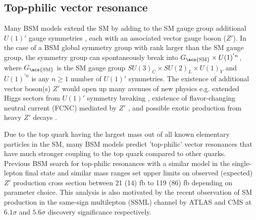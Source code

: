 \documentclass[../thesis.tex]{subfiles}
\begin{document}
\subsection{Top-philic vector resonance}
\label{sec:ttZp}
Many \acs{BSM} models extend the \acs{SM} by adding to the \acs{SM} gauge group additional $U(1)'$ gauge symmetries \citep{theory:Zp_U1p,theory:Zp_U1p_ee}, each with an associated vector gauge boson ($Z'$). In the case of a \acs{BSM} global symmetry group with rank larger than the \acs{SM} gauge group, the symmetry group can spontaneously break into $G_\text{\acs{SM}}\times U(1)^{'n}$, where $G_\text{\acs{SM}}$ is the \acs{SM} gauge group $SU(3)_C \times SU(2)_L \times U(1)_Y$ and $U(1)^{'n}$ is any $n\geq 1$ number of $U(1)'$ symmetries. The existence of additional vector boson(s) $Z'$ would open up many avenues of new physics e.g. extended Higgs sectors from $U(1)'$ symmetry breaking \citep{theory:little_higgs,theory:little_higgs2}, existence of flavor-changing neutral current (FCNC) mediated by $Z'$ \citep{theory:fcnc}, and possible exotic production from heavy $Z'$ decays \citep{theory:Zp}.

Due to the top quark having the largest mass out of all known elementary particles in the \acs{SM}, many \acs{BSM} models \citep{Darm__2021,Craig:2015jba,Craig_2017,Branco:2011iw,PhysRevD.93.075038,higgscomp,theory:ttZp_LHC,theory:Zp_topphilic} predict 'top-philic' vector resonances that have much stronger coupling to the top quark compared to other quarks.
Previous \acs{BSM} \tttt search for top-philic resonances \citep{theory:ttZp_1los} with a similar model in the single-lepton final state and similar mass ranges set upper limits on observed (expected) $Z'$ production cross section between 21 (14) fb to 119 (86) fb depending on parameter choice. This analysis is also motivated by the recent observation of \acs{SM} \tttt production in the same-sign multilepton (\acs{SSML}) channel by ATLAS \citep{tttt_obs} and CMS \citep{tttt_obs_cms} at $6.1\sigma$ and $5.6\sigma$ discovery significance respectively.
\end{document}

